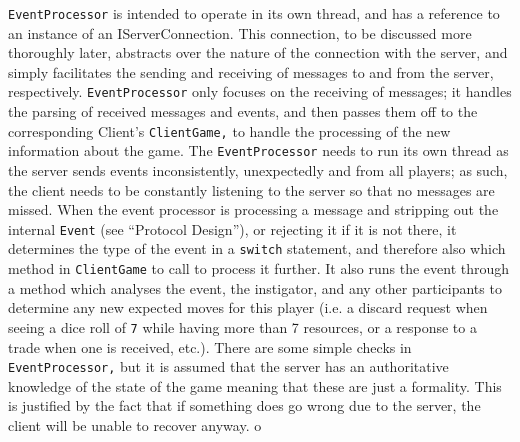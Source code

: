 \documentclass[a4paper,doc]{apa6}
\newcommand{\code}{\texttt}
\begin{document}
\code{EventProcessor} is intended to operate in its own thread, and has a reference to an instance of an IServerConnection. This connection, to be discussed more thoroughly later, abstracts over the nature of the connection with the server, and simply facilitates the sending and receiving of messages to and from the server, respectively. \code{EventProcessor} only focuses on the receiving of messages; it handles the parsing of received messages and events, and then passes them off to the corresponding Client’s \code{ClientGame,} to handle the processing of the new information about the game. The \code{EventProcessor} needs to run its own thread as the server sends events inconsistently, unexpectedly and from all players; as such, the client needs to be constantly listening to the server so that no messages are missed. When the event processor is processing a message and stripping out the internal \code{Event}  (see “Protocol Design”), or rejecting it if it is not there, it determines the type of the event in a \code{switch} statement, and therefore also which method in \code{ClientGame} to call to process it further. It also runs the event through a method which analyses the event, the instigator, and any other participants to determine any new expected moves for this player (i.e. a discard request when seeing a dice roll of \code{7} while having more than 7 resources, or a response to a trade when one is received, etc.). There are some simple checks in \code{EventProcessor,} but it is assumed that the server has an authoritative knowledge of the state of the game meaning that these are just a formality. This is justified by the fact that if something does go wrong due to the server, the client will be unable to recover anyway. o
\end{document}
